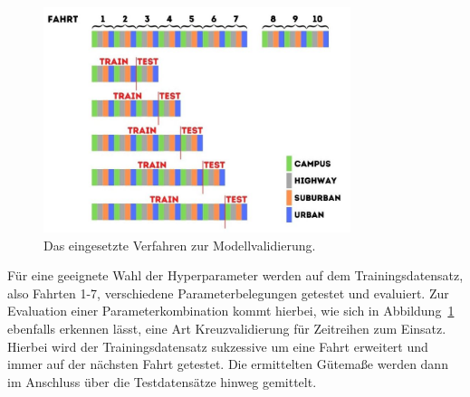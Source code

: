 \begin{figure}
    \centering
    \includegraphics[width=0.8\textwidth]{abbildungen/validierung}
    \caption{Das eingesetzte Verfahren zur Modellvalidierung.}
    \label{fig:validierung}
\end{figure}

F\"ur eine geeignete Wahl der Hyperparameter werden auf dem Trainingsdatensatz, also Fahrten 1-7, verschiedene Parameterbelegungen
getestet und evaluiert. Zur Evaluation einer Parameterkombination kommt hierbei, wie sich in Abbildung~\ref{fig:validierung} ebenfalls
erkennen l\"asst, eine Art Kreuzvalidierung f\"ur Zeitreihen zum Einsatz. Hierbei wird der Trainingsdatensatz sukzessive um eine Fahrt
erweitert und immer auf der n\"achsten Fahrt getestet. Die ermittelten G\"utema{\ss}e werden dann im Anschluss \"uber die
Testdatens\"atze hinweg gemittelt.
